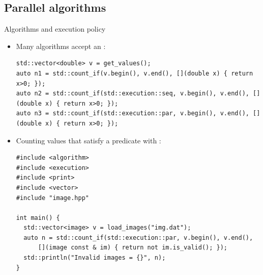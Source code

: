 \subsection{Parallel algorithms}

\begin{frame}[t,fragile]{Algorithms and execution policy}
\begin{itemize}
  \item Many algorithms accept an :
\begin{lstlisting}
std::vector<double> v = get_values();
auto n1 = std::count_if(v.begin(), v.end(), [](double x) { return x>0; });
auto n2 = std::count_if(std::execution::seq, v.begin(), v.end(), [](double x) { return x>0; });
auto n3 = std::count_if(std::execution::par, v.begin(), v.end(), [](double x) { return x>0; });
\end{lstlisting}

  \item Counting values that satisfy a predicate with :
\begin{lstlisting}
#include <algorithm>
#include <execution>
#include <print>
#include <vector>
#include "image.hpp"

int main() {
  std::vector<image> v = load_images("img.dat");
  auto n = std::count_if(std::execution::par, v.begin(), v.end(), 
      [](image const & im) { return not im.is_valid(); });
  std::println("Invalid images = {}", n);
}
\end{lstlisting}

\end{itemize}
\end{frame}

